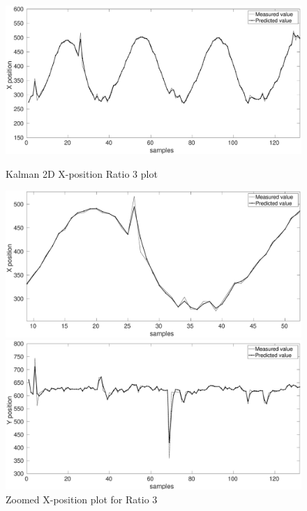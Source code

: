 \documentclass[12pt]{article}
\begin{document}
\begin{figure}[h]
\centering
\begin{minipage}{0.5\textwidth}
\centering
	\includegraphics[width = \textwidth]{./Figures/part2Ratio3X.eps}
	\caption{Kalman 2D X-position Ratio 3 plot }
	\label{fig:kalman 2D XRat3}
\end{minipage}%
\begin{minipage}{0.5\textwidth}
\centering
	\includegraphics[width = \textwidth]{./Figures/part2Ratio3Xzoomed.eps}
	\caption{ Zoomed X-position plot for Ratio 3}
	\label{fig: kalman 2D XRat3 zoom}
\end{minipage}
\begin{minipage}{0.5\textwidth}
\centering
	\includegraphics[width = \textwidth]{./Figures/part2Ratio3Y.eps}

\end{minipage}
\end{figure}
\end{document}

